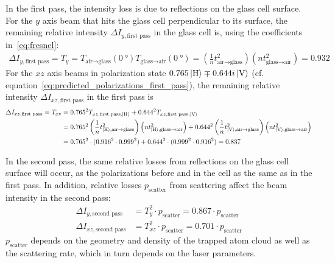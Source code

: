 In the first pass, the intensity loss is due to reflections on the glass cell surface. For the $y$ axis beam that hits the glass cell perpendicular to its surface, the remaining relative intensity $\Delta I_{y, \text{first pass}}$ in the glass cell is, using the coefficients in~\ref{eq:fresnel}:
\begin{align}
    \Delta I_{y, \text{first pass}} = T_{y} = T_{\text{air} \rightarrow \text{glass}}(\SI{0}{\degree}) T_{\text{glass} \rightarrow \text{air}}(\SI{0}{\degree}) = \left(\frac{1}{n} t^2_{\text{air} \rightarrow \text{glass}}\right) \left(n t^2_{\text{glass} \rightarrow \text{air}}\right) = \SI{0.932}{}
\end{align}
For the $xz$ axis beams in polarization state $0.765 \Ket{\text{H}} \mp 0.644i \Ket{\text{V}}$ (cf. equation~\ref{eq:predicted_polarizations_first_pass}), the remaining relative intensity $\Delta I_{xz, \text{first pass}}$ in the first pass is
\begin{align}
    \begin{split}
        \Delta I_{xz, \text{first pass}} = T_{xz} &= 0.765^2 T_{xz, \text{first pass}, \Ket{\text{H}}} + 0.644^2 T_{xz, \text{first pass}, \Ket{\text{V}}} \\
        &=  0.765^2 \left(\frac{1}{n} t^2_{\Ket{\text{H}}, \text{air} \rightarrow \text{glass}}\right) \left(n t^2_{\Ket{\text{H}}, \text{glass} \rightarrow \text{air}}\right) + 0.644^2 \left(\frac{1}{n} t^2_{\Ket{\text{V}}, \text{air} \rightarrow \text{glass}}\right) \left(n t^2_{\Ket{\text{V}}, \text{glass} \rightarrow \text{air}}\right) \\
        &= 0.765^2 \cdot (0.916^2 \cdot 0.999^2) + 0.644^2 \cdot (0.999^2 \cdot 0.916^2) = 0.837
    \end{split}
\end{align}

In the second pass, the same relative losses from reflections on the glass cell surface will occur, as the polarizations before and in the cell as the same as in the first pass. In addition, relative losses $p_\text{scatter}$ from scattering affect the beam intensity in the second pass:
\begin{align}
    \Delta I_{y, \text{second pass}} &= T^2_{y} \cdot  p_\text{scatter} =  0.867 \cdot p_\text{scatter}\\
    \Delta I_{xz, \text{second pass}} &= T^2_{xz} \cdot  p_\text{scatter} = 0.701 \cdot p_\text{scatter}
\end{align}
$p_\text{scatter}$ depends on the geometry and density of the trapped atom cloud as well as the scattering rate, which in turn depends on the laser parameters.

